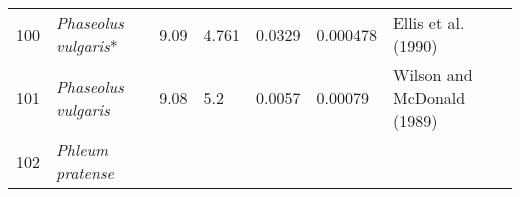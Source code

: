 \documentclass[]{article}
\begin{document}
\begin{longtable}[]{@{}lllllll@{}}
\begin{minipage}[t]{0.05\columnwidth}\raggedright
100\strut
\end{minipage} & \begin{minipage}[t]{0.23\columnwidth}\raggedright
\emph{Phaseolus vulgaris}*\strut
\end{minipage} & \begin{minipage}[t]{0.05\columnwidth}\raggedright
9.09\strut
\end{minipage} & \begin{minipage}[t]{0.08\columnwidth}\raggedright
4.761\strut
\end{minipage} & \begin{minipage}[t]{0.08\columnwidth}\raggedright
0.0329\strut
\end{minipage} & \begin{minipage}[t]{0.08\columnwidth}\raggedright
0.000478\strut
\end{minipage} & \begin{minipage}[t]{0.23\columnwidth}\raggedright
Ellis et al. (1990)\strut
\end{minipage}\tabularnewline
\begin{minipage}[t]{0.05\columnwidth}\raggedright
101\strut
\end{minipage} & \begin{minipage}[t]{0.23\columnwidth}\raggedright
\emph{Phaseolus vulgaris}\strut
\end{minipage} & \begin{minipage}[t]{0.05\columnwidth}\raggedright
9.08\strut
\end{minipage} & \begin{minipage}[t]{0.08\columnwidth}\raggedright
5.2\strut
\end{minipage} & \begin{minipage}[t]{0.08\columnwidth}\raggedright
0.0057\strut
\end{minipage} & \begin{minipage}[t]{0.08\columnwidth}\raggedright
0.00079\strut
\end{minipage} & \begin{minipage}[t]{0.23\columnwidth}\raggedright
Wilson and McDonald (1989)\strut
\end{minipage}\tabularnewline
\begin{minipage}[t]{0.05\columnwidth}\raggedright
102\strut
\end{minipage} & \begin{minipage}[t]{0.23\columnwidth}\raggedright
\emph{Phleum pratense}\strut

\end{minipage}
\end{longtable}
\end{document}
